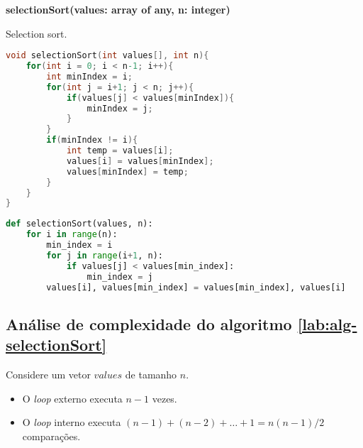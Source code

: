 \begin{center}
\begin{minipage}{.9\linewidth}
\begin{algorithm}[H]
\DontPrintSemicolon
\textbf{selectionSort(values: array of any, n: integer)}

\caption{Selection sort.}
\label{lab:alg-selectionSort}
\end{algorithm}
\end{minipage}
\end{center}

\begin{lstlisting}[language=C,caption={Selection sort em C},captionpos=t]
void selectionSort(int values[], int n){
    for(int i = 0; i < n-1; i++){
        int minIndex = i;
        for(int j = i+1; j < n; j++){
            if(values[j] < values[minIndex]){
                minIndex = j;
            }
        }
        if(minIndex != i){
            int temp = values[i];
            values[i] = values[minIndex];
            values[minIndex] = temp;
        }
    }
}
\end{lstlisting}

\begin{lstlisting}[language=python,caption={Selection sort em Python},captionpos=t]
def selectionSort(values, n):
    for i in range(n):
        min_index = i
        for j in range(i+1, n):
            if values[j] < values[min_index]:
                min_index = j
        values[i], values[min_index] = values[min_index], values[i]
\end{lstlisting}

\subsection{Análise de complexidade do algoritmo \ref{lab:alg-selectionSort}}
Considere um vetor $values$ de tamanho $n$.

\begin{itemize}
    \item O \textit{loop} externo executa $n-1$ vezes.
    \item O \textit{loop} interno executa $(n-1)+(n-2)+\dots+1 = n(n-1)/2$ comparações.
\end{itemize}

